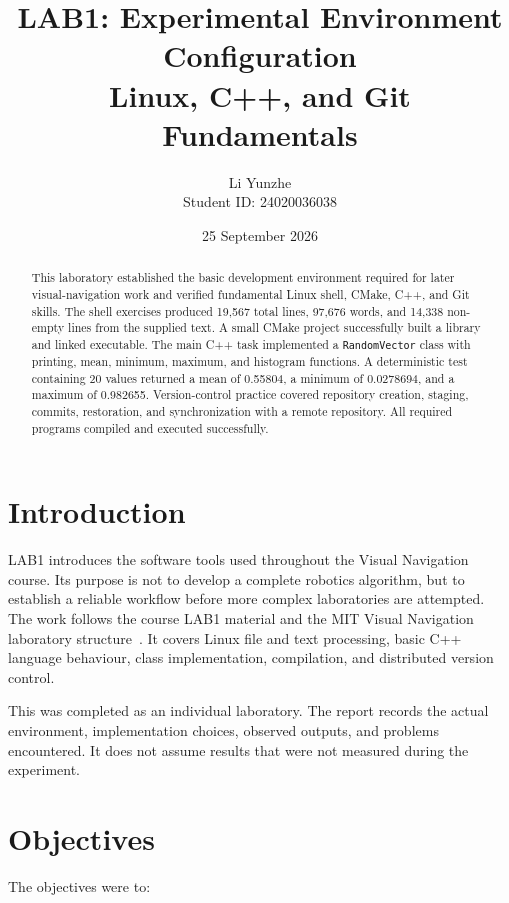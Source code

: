 \documentclass[11pt,a4paper]{article}
\title{\textbf{LAB1: Experimental Environment Configuration}\\[0.4em]
\large Linux, C++, and Git Fundamentals}
\author{Li Yunzhe\\Student ID: 24020036038}
\date{25 September 2026}
\begin{document}
\maketitle

\begin{abstract}
This laboratory established the basic development environment required for later visual-navigation work and verified fundamental Linux shell, CMake, C++, and Git skills. The shell exercises produced 19,567 total lines, 97,676 words, and 14,338 non-empty lines from the supplied text. A small CMake project successfully built a library and linked executable. The main C++ task implemented a \texttt{RandomVector} class with printing, mean, minimum, maximum, and histogram functions. A deterministic test containing 20 values returned a mean of 0.55804, a minimum of 0.0278694, and a maximum of 0.982655. Version-control practice covered repository creation, staging, commits, restoration, and synchronization with a remote repository. All required programs compiled and executed successfully.
\end{abstract}

\section{Introduction}

LAB1 introduces the software tools used throughout the Visual Navigation course. Its purpose is not to develop a complete robotics algorithm, but to establish a reliable workflow before more complex laboratories are attempted. The work follows the course LAB1 material and the MIT Visual Navigation laboratory structure~\cite{mitlab1}. It covers Linux file and text processing, basic C++ language behaviour, class implementation, compilation, and distributed version control.

This was completed as an individual laboratory. The report records the actual environment, implementation choices, observed outputs, and problems encountered. It does not assume results that were not measured during the experiment.

\section{Objectives}

The objectives were to:
\end{document}
